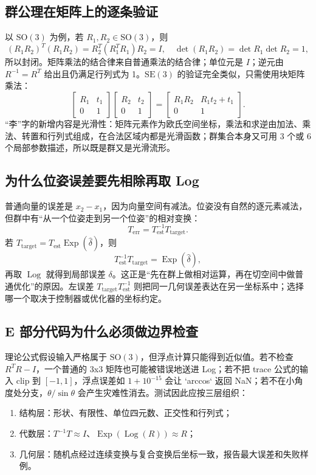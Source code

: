 \documentclass[UTF8,a4paper,11pt]{ctexart}
\newcommand{\SO}{\mathrm{SO}(3)}
\newcommand{\SE}{\mathrm{SE}(3)}
\newcommand{\Exp}{\operatorname{Exp}}
\newcommand{\Log}{\operatorname{Log}}
\begin{document}
\subsection{群公理在矩阵上的逐条验证}
以 $\SO$ 为例，若 $R_1,R_2\in\SO$，则
\[
(R_1R_2)^T(R_1R_2)=R_2^T(R_1^TR_1)R_2=I,
\quad \det(R_1R_2)=\det R_1\det R_2=1,
\]
所以封闭。矩阵乘法的结合律来自普通乘法的结合律；单位元是 $I$；逆元由 $R^{-1}=R^T$ 给出且仍满足行列式为 1。$\SE$ 的验证完全类似，只需使用块矩阵乘法：
\[
\begin{bmatrix}R_1&t_1\\0&1\end{bmatrix}
\begin{bmatrix}R_2&t_2\\0&1\end{bmatrix}
=\begin{bmatrix}R_1R_2&R_1t_2+t_1\\0&1\end{bmatrix}.
\]
“李”字的新增内容是光滑性：矩阵元素作为欧氏空间坐标，乘法和求逆由加法、乘法、转置和行列式组成，在合法区域内都是光滑函数；群集合本身又可用 3 个或 6 个局部参数描述，所以既是群又是光滑流形。

\subsection{为什么位姿误差要先相除再取 Log}
普通向量的误差是 $x_2-x_1$，因为向量空间有减法。位姿没有自然的逐元素减法，但群中有“从一个位姿走到另一个位姿”的相对变换：
\[
T_{\mathrm{err}}=T_{\mathrm{est}}^{-1}T_{\mathrm{target}}.
\]
若 $T_{\mathrm{target}}=T_{\mathrm{est}}\Exp(\hat\delta)$，则
\[
T_{\mathrm{est}}^{-1}T_{\mathrm{target}}=\Exp(\hat\delta),
\]
再取 $\Log$ 就得到局部误差 $\delta$。这正是“先在群上做相对运算，再在切空间中做普通优化”的原因。左误差 $T_{\mathrm{target}}T_{\mathrm{est}}^{-1}$ 则把同一几何误差表达在另一坐标系中；选择哪一个取决于控制器或优化器的坐标约定。

\subsection{E 部分代码为什么必须做边界检查}
理论公式假设输入严格属于 $\SO$，但浮点计算只能得到近似值。若不检查 $R^TR-I$，一个普通的 3x3 矩阵也可能被错误地送进 Log；若不把 trace 公式的输入 clip 到 $[-1,1]$，浮点误差如 $1+10^{-15}$ 会让 `arccos` 返回 NaN；若不在小角度处分支，$\theta/\sin\theta$ 会产生灾难性消去。测试因此应按三层组织：
\begin{enumerate}
\item 结构层：形状、有限性、单位四元数、正交性和行列式；
\item 代数层：$T^{-1}T\approx I$、$\Exp(\Log(R))\approx R$；
\item 几何层：随机点经过连续变换与复合变换后坐标一致，报告最大误差和失败样例。
\end{enumerate}
\end{document}
